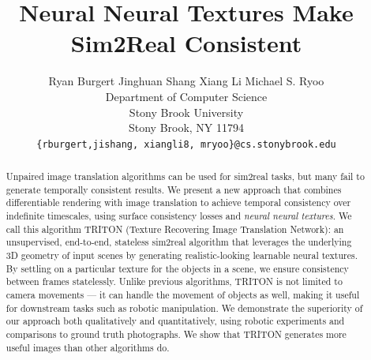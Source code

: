 \documentclass{article}
\title{Neural Neural Textures Make Sim2Real Consistent}
\author{%
	Ryan Burgert \quad Jinghuan Shang \quad Xiang Li \quad Michael S. Ryoo\\
	Department of Computer Science\\
	Stony Brook University\\
	Stony Brook, NY 11794 \\
	\texttt{\{rburgert,jishang, xiangli8, mryoo\}@cs.stonybrook.edu} \\
}
\begin{document}
\maketitle


\begin{abstract}
	Unpaired image translation algorithms can be used for sim2real tasks, but many fail to generate temporally consistent results.
	We present a new approach that combines differentiable rendering with image translation to achieve temporal consistency over indefinite timescales, using surface consistency losses and \emph{neural neural textures}.
	We call this algorithm TRITON (Texture Recovering Image Translation Network): an unsupervised, end-to-end, stateless sim2real algorithm that 
	leverages the underlying 3D geometry of input scenes by generating realistic-looking learnable neural textures.
	By settling on a particular texture for the objects in a scene, we ensure consistency between frames statelessly.
	Unlike previous algorithms, TRITON is not limited to camera movements --- it can handle the movement of objects as well, making it useful for downstream tasks such as robotic manipulation.
		We demonstrate the superiority of our approach both qualitatively and quantitatively, using robotic experiments and comparisons to ground truth photographs. We show that TRITON generates more useful images than other algorithms do.
\end{abstract}
\end{document}
